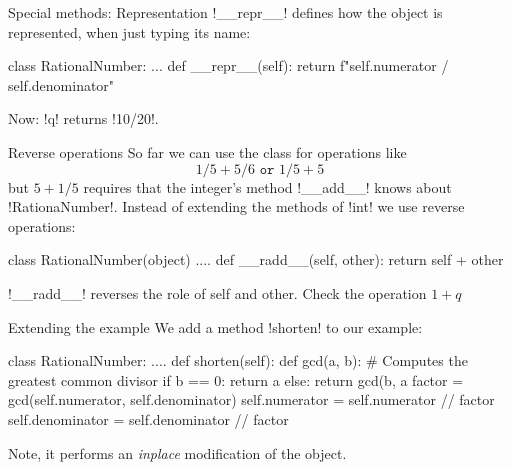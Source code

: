 \documentclass[hyperref={pdfpagelabels=false},table]{beamer}
\begin{document}
\begin{frame}[fragile]{Special methods: Representation}
\pyth!__repr__! defines how the object is represented,
when just typing its name:

\begin{python}
class RationalNumber:
 ...
  def __repr__(self):
    return f"{self.numerator} / {self.denominator}"
\end{python}
\vfill
Now:
 \pyth!q! returns \pyth!10/20!.

\end{frame}
\begin{frame}[fragile]{Reverse operations}
So far we can use the class for operations like
\[
1/5+5/6  \texttt{ or } 1/5 + 5
\]
but $5 + 1/5$ requires that the integer's method \pyth!__add__!
knows about \pyth!RationaNumber!.
\vfill
Instead of extending the methods of \pyth!int! we use reverse operations:
\begin{python}
class RationalNumber(object)
   ....
    def __radd__(self, other):
        return self + other
\end{python}
\vfill
\pyth!__radd__! reverses the role of self and other.
\vfill
Check the operation $1 + q$
\end{frame}
\begin{frame}[fragile]{Extending the example}
We add a method \pyth!shorten! to our example:
\vfill
\begin{python}

class RationalNumber:
    ....
    def shorten(self):
        def gcd(a, b):
            # Computes the greatest common divisor
            if b == 0:
                return a
            else:
                return gcd(b, a %
        factor = gcd(self.numerator, self.denominator)
        self.numerator = self.numerator // factor
        self.denominator = self.denominator // factor
\end{python}
\vfill
Note, it performs an \emph{inplace} modification of the object.
\vfill
\end{frame}
\end{document}
